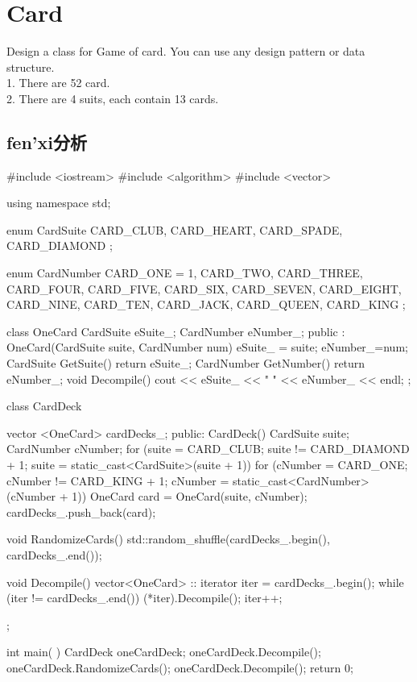 \section{Card}
Design a class for Game of card. You can use any design pattern or data structure. \\
1. There are 52 card. \\
2. There are 4 suits, each contain 13 cards.

\subsection{fen'xi分析}
\begin{Code}
	#include <iostream> 
	#include <algorithm>
	#include <vector>
	
	using namespace std; 
	
	enum CardSuite{
		CARD_CLUB, 
		CARD_HEART,
		CARD_SPADE, 
		CARD_DIAMOND
	};
	
	enum CardNumber {
		CARD_ONE = 1,
		CARD_TWO,
		CARD_THREE,
		CARD_FOUR,
		CARD_FIVE,
		CARD_SIX,
		CARD_SEVEN,
		CARD_EIGHT, 
		CARD_NINE,
		CARD_TEN,
		CARD_JACK,
		CARD_QUEEN,
		CARD_KING	
	};
	
	class OneCard{
		CardSuite eSuite_;
		CardNumber eNumber_;
	public : 
		OneCard(CardSuite suite, CardNumber num){
			eSuite_ = suite;
			eNumber_=num;
		}
		CardSuite GetSuite(){
			return eSuite_;
		}
		CardNumber GetNumber() {
			return eNumber_;
		}
		void Decompile(){
			cout << eSuite_ << " " << eNumber_ << endl;
		}
	};
	
	class CardDeck{
		vector <OneCard> cardDecks_; 
		public:
		CardDeck(){
			CardSuite suite;
			CardNumber cNumber;
			for (suite = CARD_CLUB; suite != CARD_DIAMOND + 1; suite = static_cast<CardSuite>(suite + 1)){
				for (cNumber = CARD_ONE; cNumber != CARD_KING + 1; cNumber = static_cast<CardNumber>(cNumber + 1)){
					OneCard card = OneCard(suite, cNumber);
					cardDecks_.push_back(card);
				}
			}
		}
		
		void RandomizeCards(){
			std::random_shuffle(cardDecks_.begin(), cardDecks_.end());
		}
		
		void Decompile() {
			vector<OneCard> :: iterator iter = cardDecks_.begin();
			while (iter != cardDecks_.end()){
				(*iter).Decompile();
				iter++;
			}
		}
	};
	
	
	int main( ){ 
		CardDeck oneCardDeck;
		oneCardDeck.Decompile();
		oneCardDeck.RandomizeCards();
		oneCardDeck.Decompile();
		return 0; 
	}
\end{Code}

